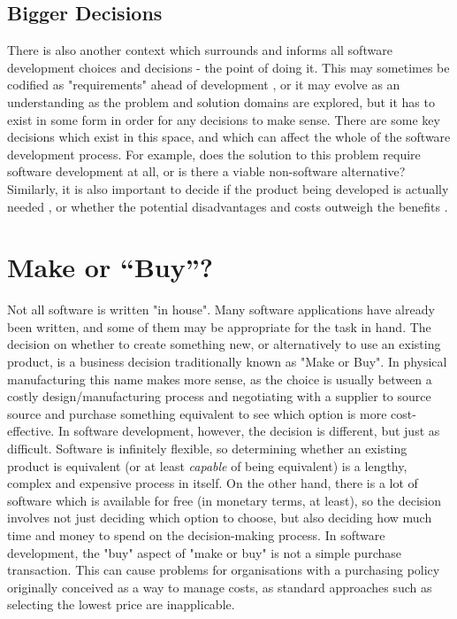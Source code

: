 \subsection{Bigger Decisions}

There is also another context which surrounds and informs all software development choices and decisions - the point of doing it. This may sometimes be codified as "requirements" ahead of development , or it may evolve as an understanding as the problem and solution domains are explored, but it has to exist in some form in order for any decisions to make sense. There are some key decisions which exist in this space, and which can affect the whole of the software development process. For example, does the solution to this problem require software development at all, or is there a viable non-software alternative? Similarly, it is also important to decide if the product being developed is actually needed , or whether the potential disadvantages and costs outweigh the benefits \citep{Linders2023}.

\section{Make or ``Buy''?}
\label{section:make or buy}

Not all software is written "in house". Many software applications have already been written, and some of them may be appropriate for the task in hand. The decision on whether to create something new, or alternatively to use an existing product, is a business decision traditionally known as "Make or Buy". In physical manufacturing this name makes more sense, as the choice is usually between a costly design/manufacturing process and negotiating with a supplier to source source and purchase something equivalent to see which option is more cost-effective. In software development, however, the decision is different, but just as difficult. Software is infinitely flexible, so determining whether an existing product is equivalent (or at least \emph{capable} of being equivalent) is a lengthy, complex and expensive process in itself. On the other hand, there is a lot of software which is available for free (in monetary terms, at least), so the decision involves not just deciding which option to choose, but also deciding how much time and money to spend on the decision-making process.  In software development, the "buy" aspect of "make or buy" is not a simple purchase transaction. This can cause problems for organisations with a purchasing policy originally conceived as a way to manage costs, as standard approaches such as selecting the lowest price are inapplicable.

